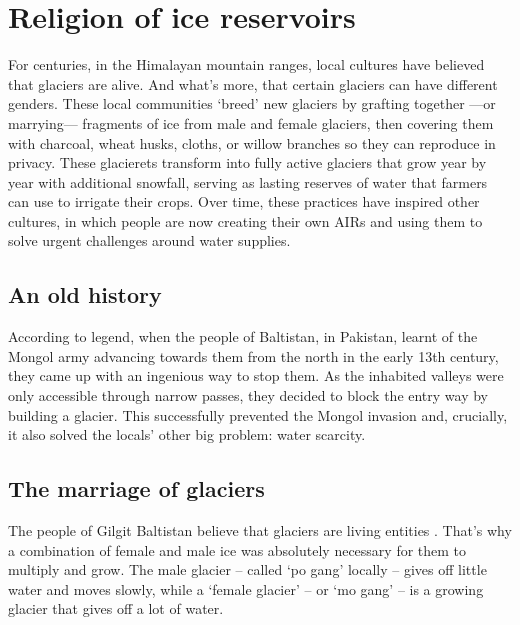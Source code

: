 \chapter{Religion of ice reservoirs}


For centuries, in the Himalayan mountain ranges, local cultures have believed that glaciers are alive. And
what’s more, that certain glaciers can have different genders. These local communities ‘breed’
new glaciers by grafting together —or marrying— fragments of ice from male and female glaciers, then covering them
with charcoal, wheat husks, cloths, or willow branches so they can reproduce in privacy. These glacierets
transform into fully active glaciers that grow year by year with additional snowfall, serving as lasting
reserves of water that farmers can use to irrigate their crops. Over time, these practices have inspired
other cultures, in which people are now creating their own \ac{AIRs} and using them to solve urgent challenges around water supplies.

\section{An old history}

According to legend, when the people of Baltistan, in Pakistan, learnt of the Mongol army advancing towards
them from the north in the early 13th century, they came up with an ingenious way to stop them. As the inhabited
valleys were only accessible through narrow passes, they decided to block the entry way by building a glacier.
This successfully prevented the Mongol invasion and, crucially, it also solved the locals’ other big problem:
water scarcity.

\section{The marriage of glaciers}

The people of Gilgit Baltistan believe that glaciers are living entities
\citep{shabinafarazGlacierMarriagesPakistan2020, khanMarriageGlaciersPrzekroj2020}. That’s why a combination of
female and male ice was absolutely necessary for them to multiply and grow. The male glacier – called ‘po gang’ locally – gives off little water and moves slowly, while a ‘female glacier’ – or ‘mo gang’ – is a growing glacier that gives off a lot of water.

